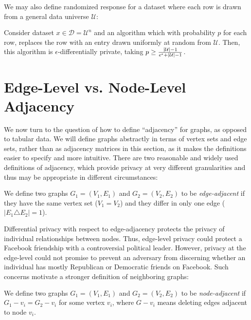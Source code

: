  We may also define randomized response for a dataset where each row is drawn from a general data universe $\mathcal{U}$:

\begin{theorem}
\label{thm:rr_gen} Consider dataset $x \in \mathcal{D} = \mathcal{U}^n$ and an algorithm which with probability $p$ for each row, replaces the row with an entry drawn uniformly at random from $\mathcal{U}$. Then, this algorithm is $\epsilon$-differentially private, taking $p \geq \frac{|\mathcal{U}| - 1}{e^{\epsilon} + |\mathcal{U}| - 1 }$.
\end{theorem}

\section{Edge-Level vs. Node-Level Adjacency}

We now turn to the question of how to define ``adjacency'' for graphs, as opposed to tabular data. We will define graphs abstractly in terms of vertex sets and edge sets, rather than as adjacency matrices in this section, as it makes the definitions easier to specify and more intuitive. There are two reasonable and widely used definitions of adjacency, which provide privacy at very different granularities and thus may be appropriate in different circumstances: 

\begin{definition}
\label{def:edge_level}
We define two graphs $G_1 = (V_1, E_1)$ and $G_2 = (V_2, E_2)$ to be \emph{edge-adjacent} if they have the same vertex set ($V_1 = V_2$) and they differ in only one edge ($\left| E_1 \triangle E_2   \right| = 1$). 
\end{definition}
Differential privacy with respect to edge-adjacency protects the privacy of individual relationships between nodes. Thus, edge-level privacy could protect a Facebook friendship with a controversial political leader. However, privacy at the edge-level could not promise to prevent an adversary from discerning whether an individual has mostly Republican or Democratic friends on Facebook. Such concerns motivate a stronger definition of neighboring graphs:

\begin{definition}
\label{def:node_level}
We define two graphs $G_1 = (V_1, E_1)$ and $G_2 = (V_2, E_2)$ to be \emph{node-adjacent} if $G_1-v_i = G_2-v_i$ for some vertex $v_i$, where $G-v_i$ means deleting edges adjacent to node $v_i$.
\end{definition}

